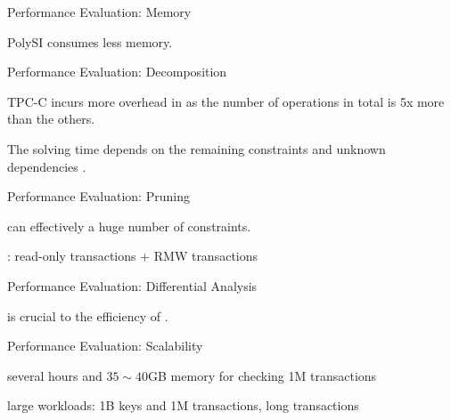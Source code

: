 \begin{frame}{Performance Evaluation: Memory}
	\centerline{PolySI consumes less memory.}
\end{frame}

\begin{frame}{Performance Evaluation: Decomposition}
	\begin{center}
		TPC-C incurs more overhead in 
		as the number of operations in total is 5x more than the others.

		\vspace{0.30cm}
		\vspace{0.30cm}

		The solving time depends on the remaining constraints
		and unknown dependencies .
	\end{center}
\end{frame}

\begin{frame}{Performance Evaluation: Pruning}
	\begin{center}
		\polysi{} can effectively  a huge number of constraints.

		\vspace{0.30cm}
		
		\vspace{0.30cm}

		: read-only transactions + RMW transactions
	\end{center}
\end{frame}

\begin{frame}{Performance Evaluation: Differential Analysis}
	\begin{center}
		 is crucial to the efficiency of \polysi.

		\vspace{0.30cm}
	\end{center}
\end{frame}

\begin{frame}{Performance Evaluation: Scalability}
	\begin{center}
		several hours and $35 \sim 40$GB memory for checking 1M transactions

		\vspace{0.30cm}
		\vspace{0.30cm}

		large workloads: 1B keys and 1M transactions, long transactions
	\end{center}
\end{frame}
